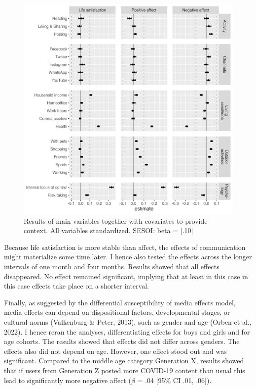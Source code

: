 \documentclass[
  man,mask,floatsintext]{apa7}
\begin{document}
\begin{figure}
\includegraphics[width=\textwidth]{figures/fig_results_comp_std} \caption{Results of main variables together with covariates to provide context. All variables standardized. SESOI: beta = |.10|}\label{fig:fig-control}
\end{figure}

Because life satisfaction is more stable than affect, the effects of communication might materialize some time later.
I hence also tested the effects across the longer intervals of one month and four months.
Results showed that all effects disappeared.
No effect remained significant, implying that at least in this case in this case effects take place on a shorter interval.

Finally, as suggested by the differential susceptibility of media effects model, media effects can depend on dispositional factors, developmental stages, or cultural norms (Valkenburg \& Peter, 2013), such as gender and age (Orben et al., 2022).
I hence reran the analyses, differentiating effects for boys and girls and for age cohorts.
The results showed that effects did not differ across genders.
The effects also did not depend on age.
However, one effect stood out and was significant.
Compared to the middle age category Generation X, results showed that if users from Generation Z posted more COVID-19 content than usual this lead to significantly more negative affect (\(\beta\) = .04 {[}95\% CI .01, .06{]}).
\end{document}
